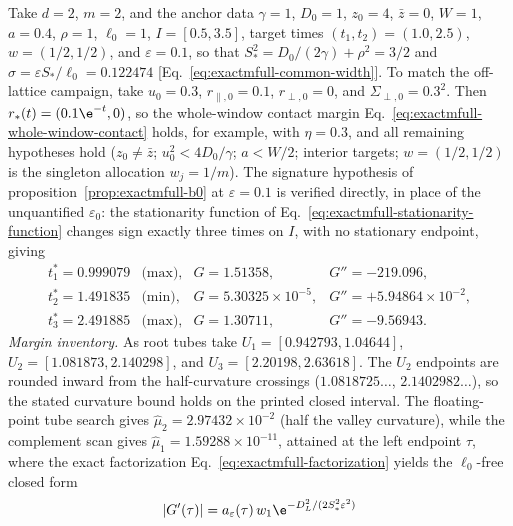 \begin{remark}
\label{rem:exactmfull-b0-anchor}
Take \(d=2\), \(m=2\), and the anchor data \(\gamma=1\), \(D_0=1\),
\(z_0=4\), \(\bar z=0\), \(W=1\), \(a=0.4\), \(\rho=1\), \(\ell_0=1\),
\(I=[0.5,3.5]\), target times \((t_1,t_2)=(1.0,2.5)\), \(w=(1/2,1/2)\), and
\(\varepsilon=0.1\), so that \(S_*^2=D_0/(2\gamma)+\rho^2=3/2\) and
\(\sigma=\varepsilon S_*/\ell_0=0.122474\)
[Eq.~\eqref{eq:exactmfull-common-width}].  To match the off-lattice campaign,
take
\(u_0=0.3\), \(r_{\parallel,0}=0.1\), \(r_{\perp,0}=0\), and
\(\Sigma_{\perp,0}=0.3^2\).  Then
\(r_*(t)=(0.1\e^{-t},0)\), so the whole-window contact margin
Eq.~\eqref{eq:exactmfull-whole-window-contact} holds, for example, with
\(\eta=0.3\), and all remaining hypotheses hold
(\(z_0\ne\bar z\); \(u_0^2<4D_0/\gamma\);
\(a<W/2\); interior targets; \(w=(1/2,1/2)\) is the singleton allocation
\(w_j=1/m\)).  The signature hypothesis of
proposition~\ref{prop:exactmfull-b0} at \(\varepsilon=0.1\) is verified
directly, in place of the unquantified \(\varepsilon_0\): the stationarity
function of Eq.~\eqref{eq:exactmfull-stationarity-function} changes sign
exactly three times on \(I\), with no stationary endpoint, giving
\begin{equation}
 \begin{array}{llll}
 t_1^*=0.999079 &\text{(max)}, & G=1.51358, & G''=-219.096,\\
 t_2^*=1.491835 &\text{(min)}, & G=5.30325\times10^{-5}, &
   G''=+5.94864\times10^{-2},\\
 t_3^*=2.491885 &\text{(max)}, & G=1.30711, & G''=-9.56943.
 \end{array}
 \label{eq:exactmfull-b0-anchor-roots}
\end{equation}
\emph{Margin inventory.}  As root tubes take
\(U_1=[0.942793,1.04644]\), \(U_2=[1.081873,2.140298]\), and
\(U_3=[2.20198,2.63618]\).  The \(U_2\) endpoints are rounded inward from
the half-curvature crossings (\(1.0818725\ldots\), \(2.1402982\ldots\)), so
the stated curvature bound holds on the printed closed interval.  The
floating-point tube search gives
\(\widehat\mu_2=2.97432\times10^{-2}\) (half the valley curvature), while
the complement scan gives
\(\widehat\mu_1=1.59288\times10^{-11}\), attained at the left
endpoint \(\tau\), where the exact factorization
Eq.~\eqref{eq:exactmfull-factorization} yields the \(\ell_0\)-free closed
form
\begin{equation}
 |G'(\tau)|
 =a_\varepsilon(\tau)\,w_1
  \e^{-D_L^2/(2S_*^2\varepsilon^2)}

\end{equation}
\end{remark}
